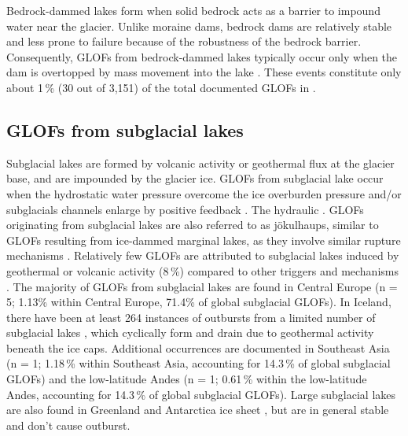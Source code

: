 
Bedrock-dammed lakes form when solid bedrock acts as a barrier to impound water near the glacier. Unlike moraine dams, bedrock dams are relatively stable and less prone to failure because of the robustness of the bedrock barrier. Consequently, GLOFs from bedrock-dammed lakes typically occur only when the dam is overtopped by mass movement into the lake \citep{Emmer2017, Huggel&al2004, Haeberli&al2017}. These events constitute only about 1\,\% (30 out of 3,151) of the total documented GLOFs in \cite{Lutzow&al2023}.

\subsection{GLOFs from subglacial lakes}
\label{subsection:glofs_subglacial_lakes}


Subglacial lakes are formed by volcanic activity or geothermal flux at the glacier base, and are impounded by the glacier ice. GLOFs from subglacial lake occur when the hydrostatic water pressure overcome the ice overburden pressure and/or subglacials channels enlarge by positive feedback \citep[][, see also the subsection GLOFs from ice-dammed marginal lakes for a review on the drainage mechanisms]{Bjornsson2010}. The hydraulic . GLOFs originating from subglacial lakes are also referred to as jökulhaups, similar to GLOFs resulting from ice-dammed marginal lakes, as they involve similar rupture mechanisms \citep{Bjornsson2010}. Relatively few GLOFs are attributed to subglacial lakes induced by geothermal or volcanic activity (8\,\%) compared to other triggers and mechanisms \citep{Lutzow&al2023}. The majority of GLOFs from subglacial lakes are found in Central Europe (n = 5; 1.13\% within Central Europe, 71.4\% of global subglacial GLOFs). In Iceland, there have been at least 264 instances of outbursts from a limited number of subglacial lakes \citep{Bjornsson2003}, which cyclically form and drain due to geothermal activity beneath the ice caps. Additional occurrences are documented in Southeast Asia (n = 1; 1.18\,\% within Southeast Asia, accounting for 14.3\,\% of global subglacial GLOFs) and the low-latitude Andes (n = 1; 0.61\,\% within the low-latitude Andes, accounting for 14.3\,\% of global subglacial GLOFs). Large subglacial lakes are also found in Greenland and Antarctica ice sheet \citep{Livingstone&al2022}, but are in general stable and don't cause outburst. 

